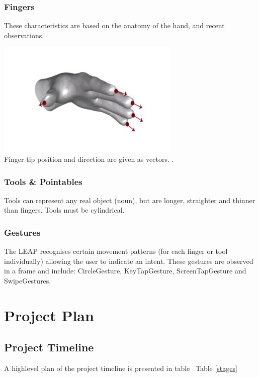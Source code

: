 \documentclass[10pt]{article}
\begin{document}
\subsubsection{Fingers}
These characteristics are based on the anatomy of the hand, and recent observations. 

\begin{center}
\includegraphics[scale=0.7]{fingers}\\
Finger tip position and direction are given as vectors. \cite{leap}.
\end{center}


\subsubsection{Tools \& Pointables}
Tools can represent any real object (noun), but are longer, straighter and thinner than fingers. Tools must be cylindrical.

\subsubsection{Gestures}
The LEAP recognises certain movement patterns (for each finger or tool individually) allowing the user to indicate an intent. These gestures are observed in a frame and include: CircleGesture, KeyTapGesture, ScreenTapGesture and SwipeGestures.


\section{Project Plan}\label{plan}

\subsection{Project Timeline}
A highlevel plan of the project timeline is presented in table ~Table \ref{stages}
\end{document}
